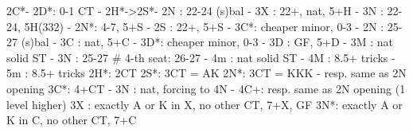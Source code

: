 2C*- 
2D*: 0-1 CT
   - 2H*->2S*- 2N : 22-24 (s)bal
             - 3X : 22+, nat, 5+H
             - 3N : 22-24, 5H(332)
        - 2N*: 4-7, 5+S
   - 2S : 22+, 5+S
        - 3C*: cheaper minor, 0-3
   - 2N : 25-27 (s)bal
   - 3C : nat, 5+C
        - 3D*: cheaper minor, 0-3
   - 3D : GF, 5+D
   - 3M : nat solid ST
   - 3N : 25-27  # 4-th seat: 26-27
   - 4m : nat solid ST
   - 4M : 8.5+ tricks
   - 5m : 8.5+ tricks
2H*: 2CT
2S*: 3CT = AK
2N*: 3CT = KKK
   - resp. same as 2N opening
3C*: 4+CT
   - 3N : nat, forcing to 4N
        - 4C+: resp. same as 2N opening (1 level higher)
3X : exactly A or K in X, no other CT, 7+X, GF
3N*: exactly A or K in C, no other CT, 7+C
